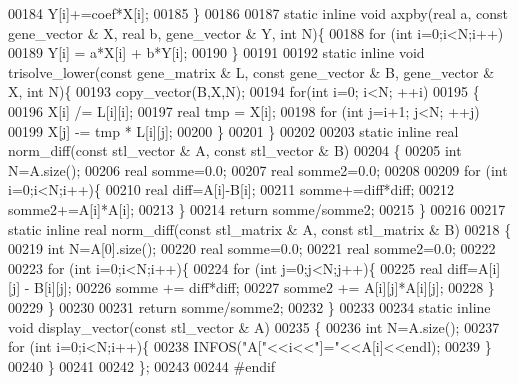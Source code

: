 \begin{DoxyCode}
00184       Y[i]+=coef*X[i];
00185   \}
00186 
00187   \textcolor{keyword}{static} \textcolor{keyword}{inline} \textcolor{keywordtype}{void} axpby(real a, \textcolor{keyword}{const} gene\_vector & X, real b, gene\_vector & Y, \textcolor{keywordtype}{int} N)\{
00188     \textcolor{keywordflow}{for} (\textcolor{keywordtype}{int} i=0;i<N;i++)
00189       Y[i] = a*X[i] + b*Y[i];
00190   \}
00191 
00192   \textcolor{keyword}{static} \textcolor{keyword}{inline} \textcolor{keywordtype}{void} trisolve\_lower(\textcolor{keyword}{const} gene\_matrix & L, \textcolor{keyword}{const} gene\_vector & B, gene\_vector & X, \textcolor{keywordtype}{int} N)\{
00193     copy\_vector(B,X,N);
00194     \textcolor{keywordflow}{for}(\textcolor{keywordtype}{int} i=0; i<N; ++i)
00195     \{
00196       X[i] /= L[i][i];
00197       real tmp = X[i];
00198       \textcolor{keywordflow}{for} (\textcolor{keywordtype}{int} j=i+1; j<N; ++j)
00199         X[j] -= tmp * L[i][j];
00200     \}
00201   \}
00202 
00203   \textcolor{keyword}{static} \textcolor{keyword}{inline} real norm\_diff(\textcolor{keyword}{const} stl\_vector & A, \textcolor{keyword}{const} stl\_vector & B)
00204   \{
00205     \textcolor{keywordtype}{int} N=A.size();
00206     real somme=0.0;
00207     real somme2=0.0;
00208 
00209     \textcolor{keywordflow}{for} (\textcolor{keywordtype}{int} i=0;i<N;i++)\{
00210       real diff=A[i]-B[i];
00211       somme+=diff*diff;
00212       somme2+=A[i]*A[i];
00213     \}
00214     \textcolor{keywordflow}{return} somme/somme2;
00215   \}
00216 
00217   \textcolor{keyword}{static} \textcolor{keyword}{inline} real norm\_diff(\textcolor{keyword}{const} stl\_matrix & A, \textcolor{keyword}{const} stl\_matrix & B)
00218   \{
00219     \textcolor{keywordtype}{int} N=A[0].size();
00220     real somme=0.0;
00221     real somme2=0.0;
00222 
00223     \textcolor{keywordflow}{for} (\textcolor{keywordtype}{int} i=0;i<N;i++)\{
00224       \textcolor{keywordflow}{for} (\textcolor{keywordtype}{int} j=0;j<N;j++)\{
00225         real diff=A[i][j] - B[i][j];
00226         somme += diff*diff;
00227         somme2 += A[i][j]*A[i][j];
00228       \}
00229     \}
00230 
00231     \textcolor{keywordflow}{return} somme/somme2;
00232   \}
00233 
00234   \textcolor{keyword}{static} \textcolor{keyword}{inline} \textcolor{keywordtype}{void} display\_vector(\textcolor{keyword}{const} stl\_vector & A)
00235   \{
00236     \textcolor{keywordtype}{int} N=A.size();
00237     \textcolor{keywordflow}{for} (\textcolor{keywordtype}{int} i=0;i<N;i++)\{
00238       INFOS(\textcolor{stringliteral}{"A["}<<i<<\textcolor{stringliteral}{"]="}<<A[i]<<endl);
00239     \}
00240   \}
00241 
00242 \};
00243 
00244 \textcolor{preprocessor}{#endif}
\end{DoxyCode}
